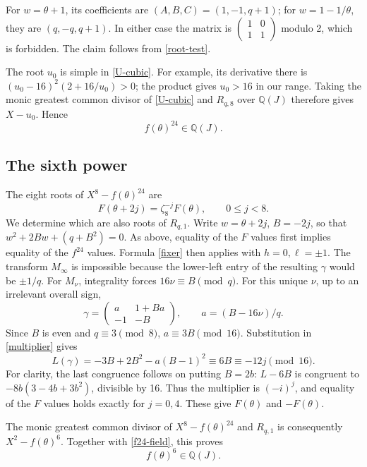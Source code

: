 \documentclass[11pt]{article}
\newcommand{\Q}{\mathbb Q}
\begin{document}
For \(w=\theta+1\), its coefficients are
\((A,B,C)=(1,-1,q+1)\); for \(w=1-1/\theta\), they are
\((q,-q,q+1)\). In either case the matrix is
\(\left(\begin{smallmatrix}1&0\\1&1\end{smallmatrix}\right)\)
modulo 2, which is forbidden. The claim follows from
\eqref{root-test}.

The root \(u_0\) is simple in \eqref{U-cubic}. For example, its
derivative there is
\((u_0-16)^2(2+16/u_0)>0\); the product gives \(u_0>16\)
in our range. Taking the monic greatest common divisor of
\eqref{U-cubic} and \(R_{q,8}\) over \(\Q(J)\) therefore gives
\(X-u_0\). Hence
\begin{equation}\label{f24-field}
 f(\theta)^{24}\in\Q(J).
\end{equation}

\subsection{The sixth power}

The eight roots of \(X^8-f(\theta)^{24}\) are
\[
 F(\theta+2j)=\zeta_8^{-j}F(\theta),\qquad 0\le j<8.
\]
We determine which are also roots of \(R_{q,1}\). Write
\(w=\theta+2j\), \(B=-2j\), so that
\(w^2+2Bw+(q+B^2)=0\). As above, equality of the \(F\) values
first implies equality of the \(f^{24}\) values. Formula
\eqref{fixer} then applies with \(h=0,\ell=\pm1\).
The transform \(M_\infty\) is impossible because the lower-left
entry of the resulting \(\gamma\) would be \(\pm1/q\).
For \(M_\nu\), integrality forces \(16\nu\equiv B\pmod q\).
For this unique \(\nu\), up to an irrelevant overall sign,
\[
 \gamma=\begin{pmatrix}a&1+Ba\\-1&-B\end{pmatrix},
 \qquad a=(B-16\nu)/q.
\]
Since \(B\) is even and \(q\equiv3\pmod8\),
\(a\equiv3B\pmod {16}\). Substitution in
\eqref{multiplier} gives
\[
 L(\gamma)=-3B+2B^2-a(B-1)^2
       \equiv6B\equiv-12j\pmod {16}.
\]
For clarity, the last congruence follows on putting \(B=2b\):
\(L-6B\) is congruent to
\(-8b(3-4b+3b^2)\), divisible by 16.
Thus the multiplier is \((-i)^j\), and equality of the \(F\)
values holds exactly for \(j=0,4\). These give
\(F(\theta)\) and \(-F(\theta)\).

The monic greatest common divisor of \(X^8-f(\theta)^{24}\)
and \(R_{q,1}\) is consequently
\(X^2-f(\theta)^6\). Together with \eqref{f24-field}, this proves
\begin{equation}\label{f6-field}
 f(\theta)^6\in\Q(J).
\end{equation}
\end{document}
